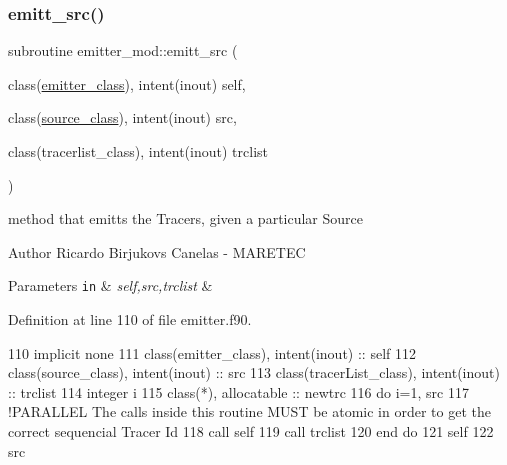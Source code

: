 \subsubsection{\texorpdfstring{emitt\+\_\+src()}{emitt\_src()}}
{\footnotesize\ttfamily subroutine emitter\+\_\+mod\+::emitt\+\_\+src (\begin{DoxyParamCaption}\item[{class(\mbox{\hyperlink{structemitter__mod_1_1emitter__class}{emitter\+\_\+class}}), intent(inout)}]{self,  }\item[{class(\mbox{\hyperlink{structsources__mod_1_1source__class}{source\+\_\+class}}), intent(inout)}]{src,  }\item[{class(tracerlist\+\_\+class), intent(inout)}]{trclist }\end{DoxyParamCaption})\hspace{0.3cm}{\ttfamily [private]}}



method that emitts the Tracers, given a particular Source 

\begin{DoxyAuthor}{Author}
Ricardo Birjukovs Canelas -\/ M\+A\+R\+E\+T\+EC 
\end{DoxyAuthor}

\begin{DoxyParams}[1]{Parameters}
\mbox{\tt in}  & {\em self,src,trclist} & \\
\hline
\end{DoxyParams}


Definition at line 110 of file emitter.\+f90.


\begin{DoxyCode}
110     \textcolor{keywordtype}{implicit none}
111     \textcolor{keywordtype}{class}(emitter\_class), \textcolor{keywordtype}{intent(inout)} :: self
112     \textcolor{keywordtype}{class}(source\_class), \textcolor{keywordtype}{intent(inout)}  :: src
113     \textcolor{keywordtype}{class}(tracerList\_class), \textcolor{keywordtype}{intent(inout)}   :: trclist
114     \textcolor{keywordtype}{integer} i
115     \textcolor{keywordtype}{class}(*), \textcolor{keywordtype}{allocatable} :: newtrc
116     \textcolor{keywordflow}{do} i=1, src%
117         \textcolor{comment}{!PARALLEL The calls inside this routine MUST be atomic in order to get the correct sequencial
       Tracer Id}
118         \textcolor{keyword}{call }self%
119         \textcolor{keyword}{call }trclist%
120 \textcolor{keywordflow}{    end do}
121     self%
122     src%
\end{DoxyCode}
\mbox{\label{namespaceemitter__mod_a6376ad0f8e1739b29caf672aa0750373}} 
